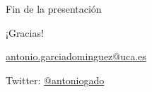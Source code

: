 \documentclass[xcolor=svgnames,compress]{beamer}
\begin{document}
\begin{frame}{Fin de la presentación}
  \begin{center}


    {\Huge ¡Gracias!}


    {\Large
      \href{mailto:antonio.garciadominguez@uca.es}{antonio.garciadominguez@uca.es}


      Twitter: \href{http://twitter.com/antoniogado}{@antoniogado}}
  \end{center}
\end{frame}
\end{document}
